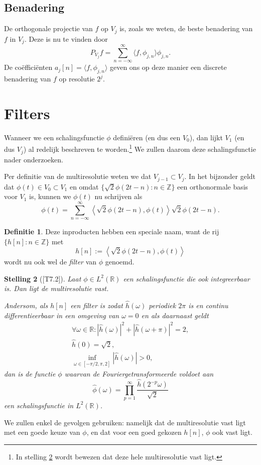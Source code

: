 \documentclass[11pt]{uvamath}
\newcommand{\R}{\mathbb{R}}
\newcommand{\Z}{\mathbb{Z}}
\theoremstyle{plain}
\newtheorem{stelling}{Stelling}[chapter]
\theoremstyle{definition}
\newtheorem{definitie}[stelling]{Definitie}
\theoremstyle{remark}
\begin{document}
\subsection{Benadering} De orthogonale projectie van $f$ op $V_j$ is, zoals we weten, de beste benadering van $f$ in $V_j$. Deze is nu te vinden door
\[
P_{V_j} f = \sum_{n=-\infty}^\infty \langle f, \phi_{j,n} \rangle \phi_{j,n}.
\]
De co\"effici\"enten $a_j[n] = \langle f, \phi_{j,n} \rangle$ geven ons op deze manier een discrete benadering van $f$ op resolutie $2^j$.

\section{Filters}
Wanneer we een schalingsfunctie $\phi$ defini\"eren (en dus een $V_0$), dan lijkt $V_1$ (en dus $V_j$) al redelijk beschreven te worden.\footnote{In stelling \ref{filter} wordt bewezen dat deze hele multiresolutie vast ligt.} We zullen daarom deze schalingsfunctie nader onderzoeken.

Per definitie van de multiresolutie weten we dat $V_{j-1} \subset V_j$. In het bijzonder geldt dat $\phi(t) \in V_0 \subset V_1$ en omdat $\{ \sqrt{2}\phi(2t - n): n \in \Z\}$ een orthonormale basis voor $V_1$ is, kunnen we $\phi(t)$ nu schrijven als
\[
\phi(t) = \sum_{n=-\infty}^{\infty} \left\langle \sqrt{2} \phi\left(2t-n\right), \phi(t) \right\rangle \sqrt{2}\phi(2t-n).
\]

\begin{definitie}
  Deze inproducten hebben een speciale naam, want de rij $\{h[n]: n \in \Z\}$ met
  \[
  h[n] := \left\langle \sqrt{2} \phi\left(2t-n\right), \phi(t) \right\rangle
  \]
  wordt nu ook wel de \emph{filter} van $\phi$ genoemd.
\end{definitie}
\begin{stelling}[{\cite{mallat}[T7.2]}]
  \label{filter}
  Laat $\phi \in L^2(\R)$ een schalingsfunctie die ook integreerbaar is. Dan ligt de multiresolutie vast.

  Andersom, als $h[n]$ een filter is zodat $\hat{h}(\omega)$ periodiek $2\pi$ is en continu differentieerbaar in een omgeving van $\omega = 0$ en als daarnaast geldt
  \begin{align*}
    \forall \omega \in \R: | \hat{h}(\omega)|^2 + |\hat{h}(\omega + \pi)|^2 = 2, \\
    \hat{h}(0) = \sqrt{2}, \\
    \inf_{\omega \in [-\pi/2, \pi,2]} |\hat{h}(\omega)| > 0,
  \end{align*}
  dan is de functie $\phi$ waarvan de Fouriergetransformeerde voldoet aan
  \[
  \hat{\phi}(\omega) = \prod_{p=1}^\infty \frac{\hat{h}(2^{-p}\omega)}{\sqrt{2}}
  \]
  een schalingsfunctie in $L^2(\R)$.
\end{stelling}
We zullen enkel de gevolgen gebruiken: namelijk dat de multiresolutie vast ligt met een goede keuze van $\phi$, en dat voor een goed gekozen $h[n]$, $\phi$ ook vast ligt.
\end{document}
